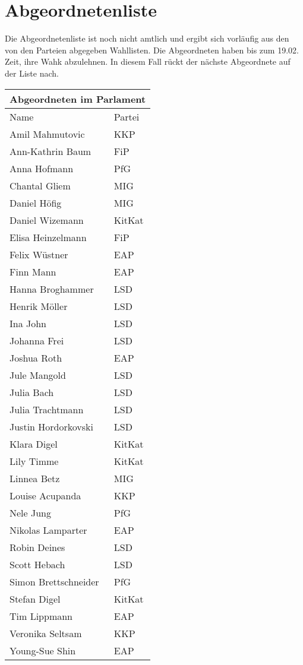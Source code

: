 \documentclass{sasbase}
\begin{document}
\section{Abgeordnetenliste}

Die Abgeordnetenliste ist noch nicht amtlich und ergibt sich vorläufig aus den von den Parteien abgegeben Wahllisten. Die Abgeordneten haben bis zum 19.02. Zeit, ihre Wahk
abzulehnen. In diesem Fall rückt der nächste Abgeordnete auf der Liste nach. 

\begin{tabular}{ |p{5cm}|p{3cm}| }
 \hline
 \multicolumn{2}{|c|}{Abgeordneten im Parlament} \\
 \hline
 Name & Partei \\
 \hline
Amil Mahmutovic & KKP \\
Ann-Kathrin Baum & FiP\\
Anna Hofmann & PfG\\
Chantal Gliem & MIG\\
Daniel Höfig & MIG\\
Daniel Wizemann & KitKat\\
Elisa Heinzelmann & FiP\\
Felix Wüstner & EAP\\
Finn Mann & EAP\\
Hanna Broghammer & LSD\\
Henrik Möller & LSD\\
Ina John & LSD\\
Johanna Frei & LSD\\
Joshua Roth & EAP\\
Jule Mangold & LSD\\
Julia Bach & LSD\\
Julia Trachtmann & LSD\\
Justin Hordorkovski & LSD\\
Klara Digel & KitKat\\
Lily Timme & KitKat\\
Linnea Betz & MIG\\
Louise Acupanda & KKP\\
Nele Jung & PfG\\
Nikolas Lamparter & EAP\\
Robin Deines & LSD\\
Scott Hebach & LSD\\
Simon Brettschneider & PfG\\
Stefan Digel & KitKat\\
Tim Lippmann & EAP\\
Veronika Seltsam & KKP\\
Young-Sue Shin & EAP\\
 \hline
\end{tabular}
\end{document}

